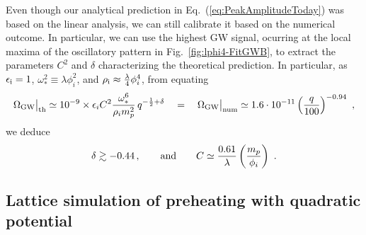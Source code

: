 \documentclass[a4paper,11pt]{article}
\begin{document}
Even though our analytical prediction in Eq.~(\ref{eq:PeakAmplitudeToday}) was based on the linear analysis, we can still calibrate it based on the numerical outcome. In particular, we can use the highest GW signal, ocurring at the local maxima of the oscillatory pattern in Fig.~\ref{fig:lphi4-FitGWB}, to extract the parameters $C^2$ and $\delta$ characterizing the theoretical prediction. In particular, as $\epsilon_{\rm i} = 1$, $\omega_*^2 \equiv \lambda \phi_i^2$,
and $\rho_{\rm i} \approx {\lambda\over4}\phi_i^4$, 
from equating
\begin{equation}
\Omega_{\rm GW}\big|_{\rm th} \simeq 10^{-9} \times \epsilon_iC^{2}\frac{\omega_*^{6}}{\rho_i m_{p}^{2}}\,q^{-\frac{1}{2}+\delta} ~~~ = ~~~ \Omega_{\rm GW}\big|_{\rm num} \simeq 1.6 \cdot 10^{-11}  \left( \frac{q}{100} \right)^{-0.94} \ ,
\end{equation}
we deduce
\begin{eqnarray}
\delta \gtrsim -0.44\,,~~~~~~{\rm and}~~~~~~ C \simeq {0.61\over \lambda}\left(\frac{m_{p}}{\phi_i}\right) \ .
\end{eqnarray}

\subsection{Lattice simulation of preheating with quadratic potential}
\label{sec:m2phi2-results}
\end{document}

